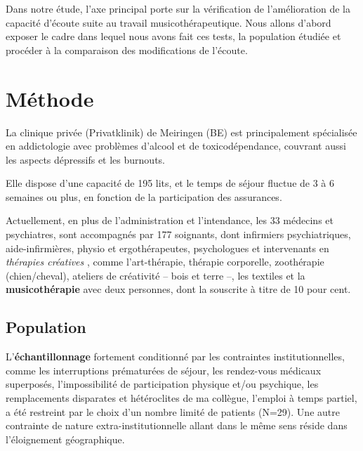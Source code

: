 
Dans notre étude, l'axe principal porte sur la
vérification de l'amélioration de
la capacité d'écoute suite au travail musicothérapeutique.
Nous allons
d'abord exposer le cadre dans lequel nous avons fait ces tests, la
population étudiée et procéder à la comparaison des modifications de
l'écoute.

\section{Méthode}

 La clinique privée (Privatklinik)
de Meiringen (BE) est  principalement spécialisée en
addictologie avec problèmes d'alcool et de toxicodépendance, couvrant aussi les aspects dépressifs
et les
burnouts.


Elle dispose d'une capacité de 195 lits, et le temps de séjour fluctue de 3 à 6 semaines ou plus, en
fonction de la participation des assurances.

Actuellement, en plus de l'administration et l'intendance, les 33
médecins et psychiatres, sont
accompagnés par 177
soignants, dont infirmiers psychiatriques, aide-infirmières, physio et
ergothérapeutes, 
psychologues et intervenants en \textit{thérapies
créatives }, comme l'art-thérapie, thérapie
corporelle, zoothérapie (chien/cheval),  ateliers de créativité --
bois et terre --,  les textiles et la\textbf{ musicothérapie} avec deux
personnes, dont la souscrite à titre de 10 pour cent.








\subsection{Population}
L'\textbf{échantillonnage} fortement conditionné par les contraintes
institutionnelles, comme les interruptions prématurées de séjour, les rendez-vous
 médicaux superposés, l'impossibilité de participation physique et/ou
 psychique, les remplacements disparates et hétéroclites de ma
 collègue, l'emploi à
 temps partiel, a été restreint  par le choix d'un nombre limité de
 patients (N=29).
Une autre contrainte de nature extra-institutionnelle allant dans le
même sens réside dans l'éloignement géographique.

